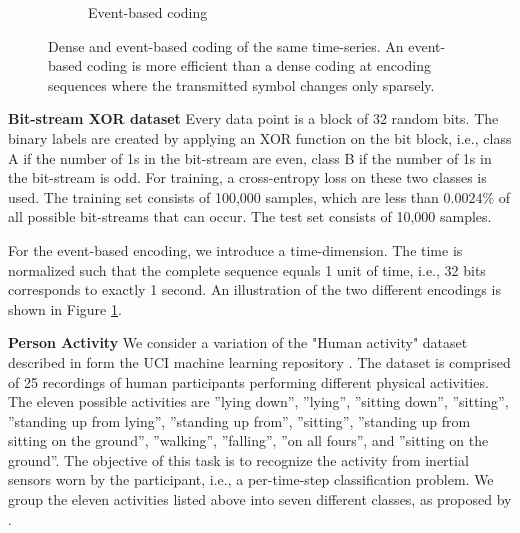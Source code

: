 \documentclass{article}
\begin{document}
\begin{figure}
\begin{subfigure}[t]{0.49\textwidth}
         \caption{Event-based coding}
     \end{subfigure}
     \caption{Dense and event-based coding of the same time-series. An event-based coding is more efficient than a dense coding at encoding sequences where the transmitted symbol changes only sparsely.}
     \label{fig:coding}
 \end{figure}


\textbf{Bit-stream XOR dataset}
Every data point is a block of 32 random bits. The binary labels are created by applying an XOR function on the bit block, i.e., class A if the number of 1s in the bit-stream are even, class B if the number of 1s in the bit-stream is odd. 
For training, a cross-entropy loss on these two classes is used. 
The training set consists of 100,000 samples, which are less than $0.0024\%$ of all possible bit-streams that can occur.
The test set consists of 10,000 samples. 

For the event-based encoding, we introduce a time-dimension.
The time is normalized such that the complete sequence equals 1 unit of time, i.e., 32 bits corresponds to exactly 1 second. 
An illustration of the two different encodings is shown in Figure \ref{fig:coding}.


\textbf{Person Activity} We consider a variation of the "Human activity" dataset described in \cite{rubanova2019latent} form the UCI machine learning repository \cite{dua2019}. 
The dataset is comprised of 25 recordings of human participants
performing different physical activities.
The eleven possible activities are ''lying down'', ''lying'', ''sitting down'', ''sitting'', ''standing up from lying'', ''standing up from'', ''sitting'', ''standing up from sitting on the ground'', ''walking'', ''falling'', ''on all fours'', and ''sitting on the ground''. 
The objective of this task is to recognize the activity from inertial sensors worn by the participant, i.e., a per-time-step classification problem.
We group the eleven activities listed above into seven different classes, as proposed by \cite{rubanova2019latent}. 
\end{document}

